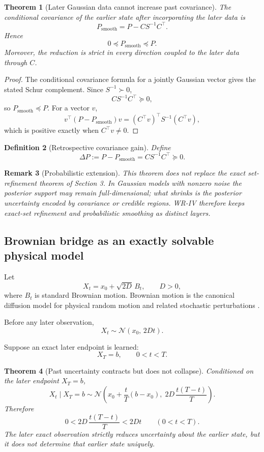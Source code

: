 \documentclass[11pt]{article}
\newtheorem{definition}{Definition}[section]
\newtheorem{theorem}[definition]{Theorem}
\newtheorem{remark}[definition]{Remark}
\begin{document}
\begin{theorem}[Later Gaussian data cannot increase past covariance]
\label{thm:gaussian-contraction}
The conditional covariance of the earlier state after incorporating the later data is
\[
P_{\mathrm{smooth}}
=
P-CS^{-1}C^\top.
\]
Hence
\[
0\preceq P_{\mathrm{smooth}}\preceq P.
\]
Moreover, the reduction is strict in every direction coupled to the later data through \(C\).
\end{theorem}

\begin{proof}
The conditional covariance formula for a jointly Gaussian vector gives the stated Schur
complement. Since \(S^{-1}\succ0\),
\[
CS^{-1}C^\top\succeq0,
\]
so \(P_{\mathrm{smooth}}\preceq P\). For a vector \(v\),
\[
v^\top(P-P_{\mathrm{smooth}})v
=
(C^\top v)^\top S^{-1}(C^\top v),
\]
which is positive exactly when \(C^\top v\neq0\).
\end{proof}

\begin{definition}[Retrospective covariance gain]
Define
\[
\Delta P:=P-P_{\mathrm{smooth}}=CS^{-1}C^\top\succeq0.
\]
\end{definition}

\begin{remark}[Probabilistic extension]
This theorem does not replace the exact set-refinement theorem of Section 3. In Gaussian
models with nonzero noise the posterior support may remain full-dimensional; what shrinks
is the posterior uncertainty encoded by covariance or credible regions. WR-IV therefore
keeps exact-set refinement and probabilistic smoothing as distinct layers.
\end{remark}

\subsection{Brownian bridge as an exactly solvable physical model}

Let
\[
X_t=x_0+\sqrt{2D}\,B_t,
\qquad
D>0,
\]
where \(B_t\) is standard Brownian motion. Brownian motion is the canonical diffusion model
for physical random motion and related stochastic perturbations
\cite{KaratzasShreve1998}.

Before any later observation,
\[
X_t\sim
\mathcal N(x_0,\,2Dt).
\]

Suppose an exact later endpoint is learned:
\[
X_T=b,
\qquad
0<t<T.
\]

\begin{theorem}[Past uncertainty contracts but does not collapse]
\label{thm:brownian-bridge}
Conditioned on the later endpoint \(X_T=b\),
\[
X_t\mid X_T=b
\sim
\mathcal N\!\left(
x_0+\frac{t}{T}(b-x_0),
\;
2D\,\frac{t(T-t)}{T}
\right).
\]
Therefore
\[
0<
2D\,\frac{t(T-t)}{T}
<
2Dt
\qquad
(0<t<T).
\]
The later exact observation strictly reduces uncertainty about the earlier state, but it does
not determine that earlier state uniquely.
\end{theorem}
\end{document}
